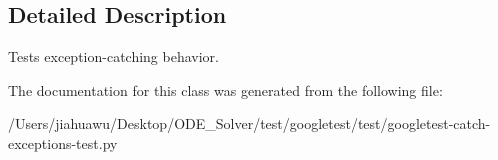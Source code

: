 \subsection{Detailed Description}
\begin{DoxyVerb}Tests exception-catching behavior.\end{DoxyVerb}
 

The documentation for this class was generated from the following file\+:\begin{DoxyCompactItemize}
\item 
/\+Users/jiahuawu/\+Desktop/\+O\+D\+E\+\_\+\+Solver/test/googletest/test/googletest-\/catch-\/exceptions-\/test.\+py\end{DoxyCompactItemize}
